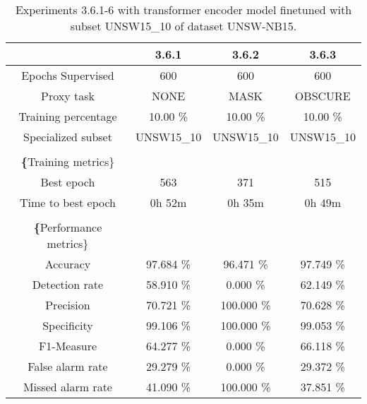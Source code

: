 \begin{table}[htb]
    \centering
    \begin{tabular}{@{}cccc@{}}
        \toprule
         & 3.6.1 & 3.6.2 & 3.6.3 \\
        \midrule
        Epochs Supervised &  600 &  600 &  600 \\
        Proxy task &  NONE &  MASK &  OBSCURE \\
        Training percentage &  10.00 \% &  10.00 \% &  10.00 \% \\
        Specialized subset &  UNSW15\_10 &  UNSW15\_10 &  UNSW15\_10 \\
         \\
        \textbf\{Training metrics\} &  &  &  \\
        Best epoch &  563 &  371 &  515 \\
        Time to best epoch &  0h 52m &  0h 35m &  0h 49m \\
         \\
        \textbf\{Performance metrics\} &  &  &  \\
        Accuracy &  97.684 \% &  96.471 \% &  97.749 \% \\
        Detection rate &  58.910 \% &  0.000 \% &  62.149 \% \\
        Precision &  70.721 \% &  100.000 \% &  70.628 \% \\
        Specificity &  99.106 \% &  100.000 \% &  99.053 \% \\
        F1-Measure &  64.277 \% &  0.000 \% &  66.118 \% \\
        False alarm rate &  29.279 \% &  0.000 \% &  29.372 \% \\
        Missed alarm rate &  41.090 \% &  100.000 \% &  37.851 \% \\
        \bottomrule
    \end{tabular}
    \caption{Experiments 3.6.1-6 with transformer encoder model finetuned with subset UNSW15\_10 of dataset UNSW-NB15.}
    \label{table:results:lstm:stats_flows15_subset}
\end{table}